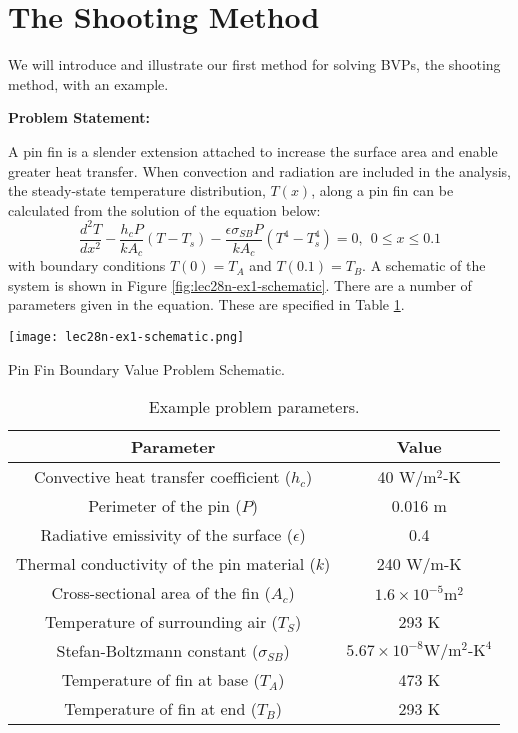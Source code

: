 \section{The Shooting Method}
We will introduce and illustrate our first method for solving BVPs, the shooting method, with an example.

\vspace{0.25cm}

\noindent\textbf{Problem Statement:}

\vspace{0.1cm}

\noindent A pin fin is a slender extension attached to increase the surface area and enable greater heat transfer.  When convection and radiation are included in the analysis, the steady-state temperature distribution, $T(x)$, along a pin fin can be calculated from the solution of the equation below:
\begin{equation}
\frac{d^2T}{dx^2} - \frac{h_cP}{kA_c}\left(T - T_s\right)-\frac{\epsilon \sigma_{SB}P}{k A_c}\left(T^4 - T_s^4 \right) = 0, \ \ 0 \le x \le 0.1
\end{equation}
with boundary conditions $T(0)=T_A$ and $T(0.1)=T_B$.  A schematic of the system is shown in Figure \ref{fig:lec28n-ex1-schematic}.  There are a number of parameters given in the equation.  These are specified in Table \ref{tab:lec28n-ex1-parameters}.
\begin{marginfigure}[-4.5cm]
\texttt{[image: lec28n-ex1-schematic.png]}
\caption{Pin Fin Boundary Value Problem Schematic.}
\label{fig:lec28n-ex1-schematic}
\end{marginfigure}

\begin{table}
\begin{tabular}{|c|c|}
\hline
\textbf{Parameter} & \textbf{Value} \\ \hline
Convective heat transfer coefficient ($h_c$) & 40 $\text{W}/\text{m}^2\text{-K}$ \\ \hline
Perimeter of the pin ($P$) & 0.016 m \\ \hline
Radiative emissivity of the surface ($\epsilon$) & 0.4 \\ \hline
Thermal conductivity of the pin material ($k$) & 240 $\text{W}/\text{m-K}$ \\ \hline
Cross-sectional area of the fin ($A_c$) & $1.6 \times 10^{-5} \text{m}^2$ \\ \hline
Temperature of surrounding air ($T_S$) & 293 K \\ \hline
Stefan-Boltzmann constant ($\sigma_{SB}$) & $5.67 \times 10^{-8} \text{W}/\text{m}^2\text{-K}^4$ \\ \hline
Temperature of fin at base ($T_A$) & 473 K \\ \hline
Temperature of fin at end ($T_B$) & 293 K \\ \hline
\end{tabular}
\caption{Example problem parameters.}
\label{tab:lec28n-ex1-parameters}
\end{table}

